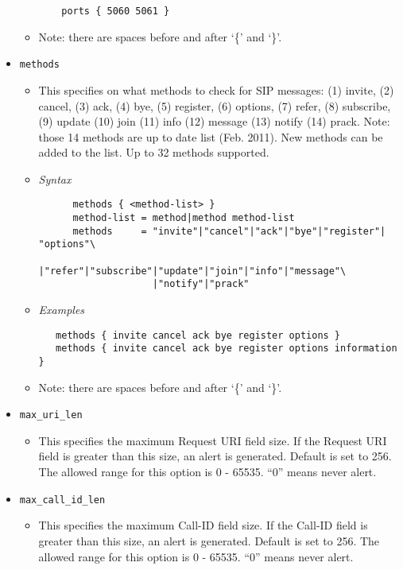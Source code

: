 \documentclass[english]{report}
\begin{document}
\begin{itemize}
\begin{itemize}
\begin{verbatim}
    ports { 5060 5061 }
\end{verbatim}
\item[] Note: there are spaces before and after `\{' and `\}'.
\end{itemize}
 \item[] \texttt{methods}
\begin{itemize}
  \item[]  This specifies on what methods to check for SIP messages: (1) invite, 
      (2) cancel, (3) ack, (4) bye, (5) register, (6) options, (7) refer, 
      (8) subscribe, (9) update (10) join (11) info (12) message (13) notify 
      (14) prack.
      Note: those 14 methods are up to date list (Feb. 2011). New methods can be 
      added to the list. Up to 32 methods supported.

\item[] \textit{Syntax}
\begin{verbatim}
      methods { <method-list> }
      method-list = method|method method-list
      methods     = "invite"|"cancel"|"ack"|"bye"|"register"| "options"\
                    |"refer"|"subscribe"|"update"|"join"|"info"|"message"\                
                    |"notify"|"prack"
\end{verbatim}
\item[] \textit{Examples}
\begin{verbatim}
   methods { invite cancel ack bye register options }
   methods { invite cancel ack bye register options information }
\end{verbatim}    
\item[] Note: there are spaces before and after `\{' and `\}'.
\end{itemize}
\item[] \texttt{max\_uri\_len}
\begin{itemize}
  \item[] This specifies the maximum Request URI field size. If the Request URI field
      is greater than this size, an alert is generated. Default is set to 256. 
      The allowed range for this option is 0 - 65535. ``0'' means never alert.
\end{itemize}

\item[] \texttt{max\_call\_id\_len}
\begin{itemize}
  \item[] This specifies the maximum Call-ID field size. If the Call-ID field is 
      greater than this size, an alert is generated. Default is set to 256. 
      The allowed range for this option is 0 - 65535. ``0'' means never alert.
\end{itemize}


\end{itemize}
\end{document}
